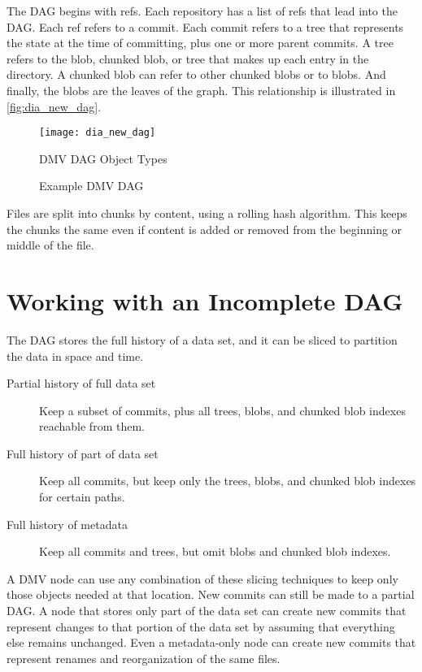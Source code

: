 The DAG begins with refs. Each repository has a list of refs that lead into the
DAG. Each ref refers to a commit. Each commit refers to a tree that represents
the state at the time of committing, plus one or more parent commits. A tree
refers to the blob, chunked blob, or tree that makes up each entry in the
directory. A chunked blob can refer to other chunked blobs or to blobs. And
finally, the blobs are the leaves of the graph. This relationship is illustrated
in \autoref{fig:dia_new_dag}.


\begin{figure}[]
    \centering
        \texttt{[image: dia\_new\_dag]}
    \caption{DMV DAG Object Types}
    \label{fig:dia_new_dag}
\end{figure}

\begin{figure}[]
    \centering
    \caption{Example DMV DAG}
    \label{dia_example_dmv_dag}
\end{figure}


Files are split into chunks by content, using a rolling hash algorithm. This
keeps the chunks the same even if content is added or removed from the beginning
or middle of the file.


\section{Working with an Incomplete DAG}

The DAG stores the full history of a data set, and it can be sliced to partition
the data in space and time.

\begin{description}

    \item[Partial history of full data set] Keep a subset of commits, plus all
        trees, blobs, and chunked blob indexes reachable from them.

    \item[Full history of part of data set] Keep all commits, but keep only the
        trees, blobs, and chunked blob indexes for certain paths.

    \item[Full history of metadata] Keep all commits and trees, but
        omit blobs and chunked blob indexes.

\end{description}

A DMV node can use any combination of these slicing techniques to keep only
those objects needed at that location. New commits can still be made to a
partial DAG. A node that stores only part of the data set can create new commits
that represent changes to that portion of the data set by assuming that
everything else remains unchanged. Even a metadata-only node can create new
commits that represent renames and reorganization of the same files.

